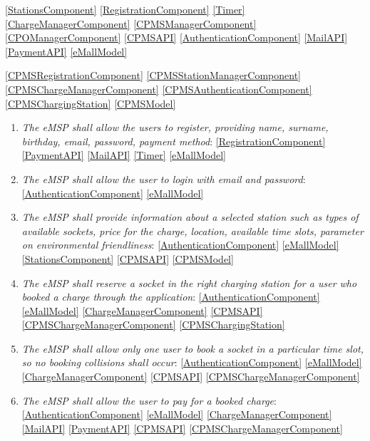 \ref{StationsComponent}
\ref{RegistrationComponent}
\ref{Timer}
\ref{ChargeManagerComponent}
\ref{CPMSManagerComponent}
\ref{CPOManagerComponent}
\ref{CPMSAPI}
\ref{AuthenticationComponent}
\ref{MailAPI}
\ref{PaymentAPI}
\ref{eMallModel}

\ref{CPMSRegistrationComponent}
\ref{CPMSStationManagerComponent}
\ref{CPMSChargeManagerComponent}
\ref{CPMSAuthenticationComponent}
\ref{CPMSChargingStation}
\ref{CPMSModel}

\begin{enumerate}[label=\textbf{R\arabic*}]
    \item \textit{The \ac{eMSP} shall allow the users to register, providing name, surname, birthday, email, password, payment method}: 
    \ref{RegistrationComponent}
    \ref{PaymentAPI}
    \ref{MailAPI}
    \ref{Timer}
    \ref{eMallModel}
    \label{req:eMSP-user-registration}
    \item \textit{The \ac{eMSP} shall allow the user to login with email and password}:
    \ref{AuthenticationComponent}
    \ref{eMallModel}
    \label{req:eMSP-user-login}
    \item \textit{The \ac{eMSP} shall provide information about a selected station such as types of available sockets, price for the charge, location, available time slots, parameter on environmental friendliness}:
    \ref{AuthenticationComponent}
    \ref{eMallModel}
    \ref{StationsComponent}
    \ref{CPMSAPI}
    \ref{CPMSModel}
    \label{req:eMSP-info-station}
    \item \textit{The \ac{eMSP} shall reserve a socket in the right charging station for a user who booked a charge through the application}:
    \ref{AuthenticationComponent}
    \ref{eMallModel} \ref{ChargeManagerComponent}
    \ref{CPMSAPI}
    \ref{CPMSChargeManagerComponent}
    \ref{CPMSChargingStation}
    \label{req:eMSP-reserve-socket}
    \item \textit{The \ac{eMSP} shall allow only one user to book a socket in a particular time slot, so no booking collisions shall occur}:
    \ref{AuthenticationComponent}
    \ref{eMallModel}
    \ref{ChargeManagerComponent}
    \ref{CPMSAPI}
    \ref{CPMSChargeManagerComponent}
    \label{req:eMSP-no-book-collisions}
    \item \textit{The \ac{eMSP} shall allow the user to pay for a booked charge}:
    \ref{AuthenticationComponent}
    \ref{eMallModel}
    \ref{ChargeManagerComponent}
    \ref{MailAPI}
    \ref{PaymentAPI}
    \ref{CPMSAPI}
    \ref{CPMSChargeManagerComponent}
    \label{req:eMSP-payment}

\end{enumerate}
